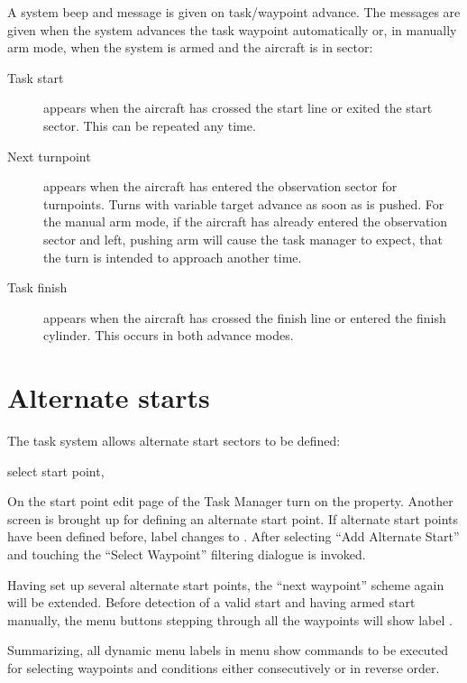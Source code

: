 A system beep and message is given on task/waypoint advance.  The
messages are given when the system advances the task waypoint
automatically or, in manually arm mode, when the system is armed and the
aircraft is in sector:
\begin{description}
\item[Task start]  appears when the aircraft has crossed the start line or
 exited the start sector. This can be repeated any time.
\item[Next turnpoint]  appears when the aircraft has entered the observation
 sector for turnpoints. Turns with variable target advance as soon as
  is pushed.  For the manual arm mode, if the
 aircraft has already entered the observation sector and left, pushing arm will
 cause the task manager to expect, that the turn is intended to approach
 another time.
\item[Task finish]  appears when the aircraft has crossed the finish line
 or entered the finish cylinder.  This occurs in both advance modes.
\end{description}


\section{Alternate starts}\label{sec:alternate-starts}

The task system allows alternate start sectors to be defined:

\blink{} select start point, \blink{}

On the start point edit page of the Task Manager turn on the  property. Another screen is brought up for defining an
alternate start point. If alternate start points have been defined before, label  changes to . After selecting ``Add Alternate Start'' and touching
 the ``Select Waypoint'' filtering dialogue is invoked.

Having set up several alternate start points, the ``next waypoint'' scheme again will be extended. Before detection of a valid start and having armed start manually, the menu buttons stepping through all the waypoints will show label .

Summarizing, all dynamic menu labels in menu  show commands to be
executed for selecting waypoints and conditions either consecutively or in reverse
order.


